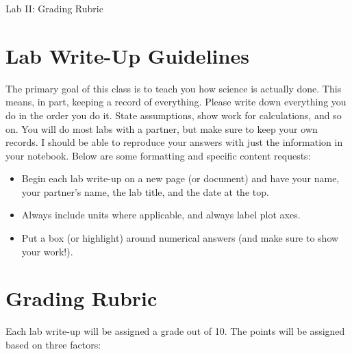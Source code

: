 \documentclass[12pt]{article}
\begin{document}
\begin{center}
{\huge Lab II: Grading Rubric}\\
\medskip
\end{center}

\bigskip

\section{Lab Write-Up Guidelines}

The primary goal of this class is to teach you how science is actually done. This means, in part, keeping a record of everything. Please write down everything you do in the order you do it. State assumptions, show work for calculations, and so on. You will do most labs with a partner, but make sure to keep your own records. I should be able to reproduce your answers with just the information in your notebook. Below are some formatting and specific content requests:

\begin{itemize}
\item Begin each lab write-up on a new page (or document) and have your name, your partner's name, the lab title, and the date at the top.
\item Always include units where applicable, and always label plot axes.
\item Put a box (or highlight) around numerical answers (and make sure to show your work!).
\end{itemize}

\section{Grading Rubric}

Each lab write-up will be assigned a grade out of 10. The points will be assigned based on three factors:
\end{document}

